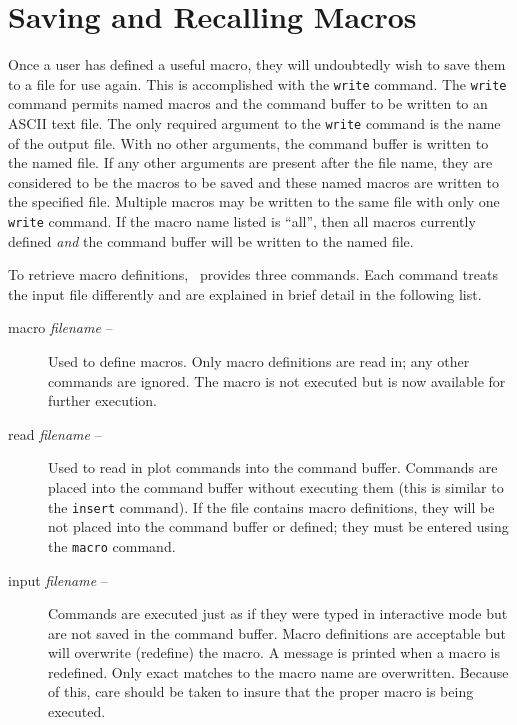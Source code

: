 \section		{Saving and Recalling Macros}

Once a user has defined a useful macro, they will undoubtedly wish to
save them to a file for use again.
This is accomplished with the
{\tt write}
command.
The {\tt write} command permits named macros and the command buffer to
be written to an ASCII text file.
The only required argument to the {\tt write} command
is the name of the output file.
With no other arguments, the command buffer is written to the named file.
If any other arguments are present after the file name,
they are considered to be the macros to be saved and these named macros
are written to the specified file.
Multiple macros may be written to the same file with only one
{\tt write} command.
If the macro name listed is ``all'', then all macros currently defined
{\em and} the command buffer will be written to the named file.

To retrieve macro definitions, \wip\ provides three
commands.
Each command treats the input file differently and are explained in
brief detail in the following list.
\begin{description}
  \item [{macro {\em filename} --}]
    Used to define macros.
    Only macro definitions are read in; any other commands are ignored.
    The macro is not executed but is now available for further execution.
  \item [{read {\em filename} --}]
    Used to read in plot commands into the command buffer.
    Commands are placed into the command buffer without executing them
    (this is similar to the {\tt insert}
    command).
    If the file contains macro definitions,
    they will be not placed into the command buffer or
    defined; they must be entered using the {\tt macro} command.
  \item [{input {\em filename} --}]
    Commands are executed just as if they were typed in interactive mode
    but are not saved in the command buffer.
    Macro definitions are acceptable but will overwrite (redefine)
    the macro.  A message is printed when a macro is redefined.
    Only exact matches to the macro name are overwritten.
    Because of this, care should be taken to insure that
    the proper macro is being executed.
\end{description}
